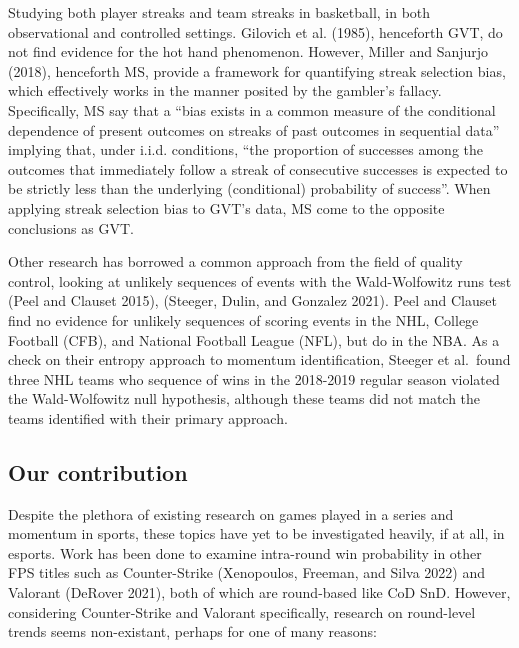\documentclass{article}
\begin{document}
Studying both player streaks and team streaks in basketball, in both
observational and controlled settings. Gilovich et al. (1985),
henceforth GVT, do not find evidence for the hot hand phenomenon.
However, Miller and Sanjurjo (2018), henceforth MS, provide a framework
for quantifying streak selection bias, which effectively works in the
manner posited by the gambler's fallacy. Specifically, MS say that a
``bias exists in a common measure of the conditional dependence of
present outcomes on streaks of past outcomes in sequential data''
implying that, under i.i.d. conditions, ``the proportion of successes
among the outcomes that immediately follow a streak of consecutive
successes is expected to be strictly less than the underlying
(conditional) probability of success''. When applying streak selection
bias to GVT's data, MS come to the opposite conclusions as GVT.

Other research has borrowed a common approach from the field of quality
control, looking at unlikely sequences of events with the Wald-Wolfowitz
runs test (Peel and Clauset 2015), (Steeger, Dulin, and Gonzalez 2021).
Peel and Clauset find no evidence for unlikely sequences of scoring
events in the NHL, College Football (CFB), and National Football League
(NFL), but do in the NBA. As a check on their entropy approach to
momentum identification, Steeger et al.~found three NHL teams who
sequence of wins in the 2018-2019 regular season violated the
Wald-Wolfowitz null hypothesis, although these teams did not match the
teams identified with their primary approach.

\hypertarget{our-contribution}{%
\subsection{Our contribution}\label{our-contribution}}

Despite the plethora of existing research on games played in a series
and momentum in sports, these topics have yet to be investigated
heavily, if at all, in esports. Work has been done to examine
intra-round win probability in other FPS titles such as Counter-Strike
(Xenopoulos, Freeman, and Silva 2022) and Valorant (DeRover 2021), both
of which are round-based like CoD SnD. However, considering
Counter-Strike and Valorant specifically, research on round-level trends
seems non-existant, perhaps for one of many reasons:
\end{document}

